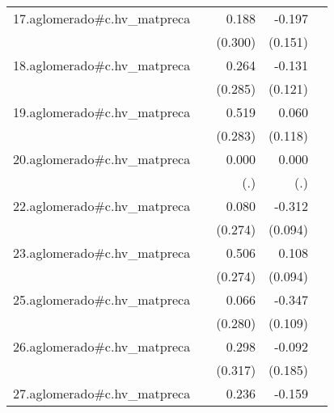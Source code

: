 {\begin{longtable}{l*{4}{D{.}{.}{-1}}}
\addlinespace
17.aglomerado#c.hv\_matpreca&                     &       0.188         &      -0.197         &                     \\
            &                     &     (0.300)         &     (0.151)         &                     \\
\addlinespace
18.aglomerado#c.hv\_matpreca&                     &       0.264         &      -0.131         &                     \\
            &                     &     (0.285)         &     (0.121)         &                     \\
\addlinespace
19.aglomerado#c.hv\_matpreca&                     &       0.519         &       0.060         &                     \\
            &                     &     (0.283)         &     (0.118)         &                     \\
\addlinespace
20.aglomerado#c.hv\_matpreca&                     &       0.000         &       0.000         &                     \\
            &                     &         (.)         &         (.)         &                     \\
\addlinespace
22.aglomerado#c.hv\_matpreca&                     &       0.080         &      -0.312\sym{***}&                     \\
            &                     &     (0.274)         &     (0.094)         &                     \\
\addlinespace
23.aglomerado#c.hv\_matpreca&                     &       0.506         &       0.108         &                     \\
            &                     &     (0.274)         &     (0.094)         &                     \\
\addlinespace
25.aglomerado#c.hv\_matpreca&                     &       0.066         &      -0.347\sym{**} &                     \\
            &                     &     (0.280)         &     (0.109)         &                     \\
\addlinespace
26.aglomerado#c.hv\_matpreca&                     &       0.298         &      -0.092         &                     \\
            &                     &     (0.317)         &     (0.185)         &                     \\
\addlinespace
27.aglomerado#c.hv\_matpreca&                     &       0.236         &      -0.159\sym{**} &                     \\

\end{longtable}}
